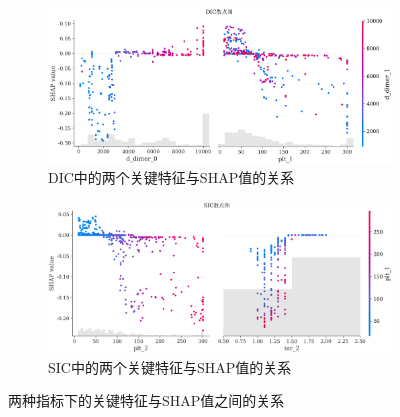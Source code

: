 \documentclass[12pt, a4paper, oneside]{ctexart}
\numberwithin{equation}{section}  %
\begin{document}
\begin{figure}[H]
   \begin{subfigure}[b]{1\textwidth}
       \hspace{-1.6cm}
       \includegraphics[scale=0.7]{SHAP/shap_dic_scatter}
       \caption{DIC中的两个关键特征与SHAP值的关系}
   \end{subfigure}

   \bigskip
   \begin{subfigure}[b]{1\textwidth}
       \hspace{-1.6cm}
       \includegraphics[scale=0.7]{SHAP/shap_sic_scatter}
       \caption{SIC中的两个关键特征与SHAP值的关系}
   \end{subfigure}
   \caption{两种指标下的关键特征与SHAP值之间的关系}
   \label{fig-shap-scatter}
\end{figure}
\end{document}
